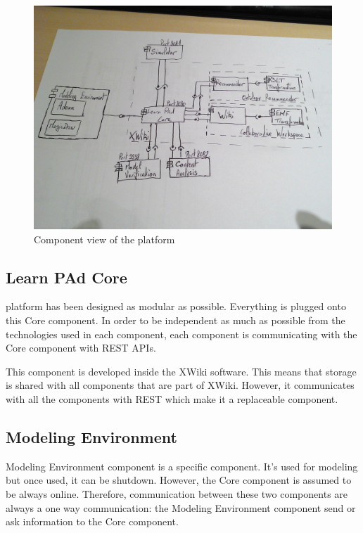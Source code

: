 \documentclass{learnpad}
\begin{document}
\begin{figure}[!htp]
	\centering
	\includegraphics[width=.6\paperwidth,keepaspectratio]{figures/learnpad-architecture.jpg}
	\caption{Component view of the \learnpad platform}
	\label{fig:component-view}
\end{figure}

\subsection{Learn PAd Core}
\learnpad platform has been designed as modular as possible.  Everything is
plugged onto this \learnpad Core component.  In order to be independent as much
as possible from the technologies used in each component, each component is
communicating with the \learnpad Core component with REST APIs.

This component is developed inside the XWiki software.  This means that storage
is shared with all components that are part of XWiki.  However, it communicates
with all the components with REST which make it a replaceable component.

\subsection{Modeling Environment}
Modeling Environment component is a specific component.  It's used for modeling
but once used, it can be shutdown.  However, the \learnpad Core component is
assumed to be always online.  Therefore, communication between these two
components are always a one way communication: the Modeling Environment
component send or ask information to the \learnpad Core component.
\end{document}
